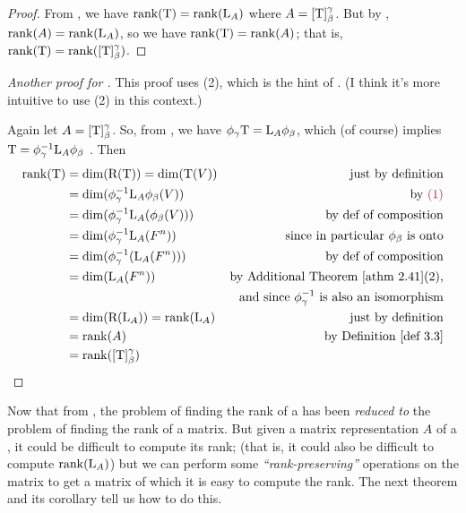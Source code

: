 \begin{proof}
From , we have \(\mathrm{rank}(\mathrm{T}) = \mathrm{rank}(\mathrm{L}_A)\) where \(A = [\mathrm{T}]_{\beta}^{\gamma}\).
But by , \(\mathrm{rank}(A) = \mathrm{rank}(\mathrm{L}_A)\), so we have \(\mathrm{rank}(\mathrm{T}) = \mathrm{rank}(A)\);
that is, \(\mathrm{rank}(\mathrm{T}) = \mathrm{rank}([\mathrm{T}]_{\beta}^{\gamma})\).
\end{proof}

\begin{proof}[Another proof for ]
This proof uses (2), which is the hint of .
(I think it's more intuitive to use (2) in this context.)

Again let \(A = [\mathrm{T}]_{\beta}^{\gamma}\).
So, from , we have \(\phi_{\gamma} \mathrm{T} = \mathrm{L}_A \phi_{\beta}\), which (of course) implies \(\mathrm{T} = \phi_{\gamma}^{-1} \mathrm{L}_A \phi_{\beta}\) .
Then
\begin{align*}
    \rankT & = \dim(\RANGET) = \dim(\T(V)) & \text{just by definition} \\
           & = \dim(\phi_{\gamma}^{-1} \LMTRAN_A \phi_{\beta}(V)) & \text{by \MAROON{(1)}} \\
           & = \dim(\phi_{\gamma}^{-1} \LMTRAN_A (\phi_{\beta}(V))) & \text{by def of composition} \\
           & = \dim(\phi_{\gamma}^{-1} \LMTRAN_A (F^n)) & \text{since in particular \(\phi_{\beta}\) is onto} \\
           & = \dim(\phi_{\gamma}^{-1} (\LMTRAN_A (F^n))) & \text{by def of composition} \\
           & = \dim(\LMTRAN_A (F^n)) & \text{by \ATHM{2.41}(2),} \\
           & & \text{and since \(\phi_{\gamma}^{-1}\) is also an isomorphism} \\
           & = \dim(\RANGE(\LMTRAN_A)) = \rank(\LMTRAN_A) & \text{just by definition} \\
           & = \rank(A) & \text{by \DEF{3.3}} \\
           & = \rank([\T]_{\beta}^{\gamma})
\end{align*}
\end{proof}

\begin{remark} \label{remark 3.2.3}
Now that from , the problem of finding the rank of a \LTRAN{} has been \emph{reduced to} the problem of finding the rank of a matrix.
But given a matrix representation \(A\) of a \LTRAN{}, it could be difficult to compute its rank;
(that is, it could also be difficult to compute \(\mathrm{rank}(\mathrm{L}_A)\))
but we can perform some \emph{``rank-preserving''} operations on the matrix to get a matrix of which it is easy to compute the rank.
The next theorem and its corollary tell us how to do this.
\end{remark}

